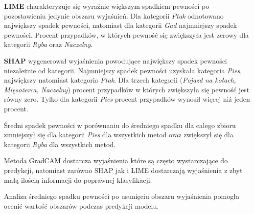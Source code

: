 \textbf{LIME} charakteryzuje się wyraźnie większym spadkiem pewności po pozostawieniu jedynie obszaru wyjaśnień.
Dla kategorii \textit{Ptak} odnotowano największy spadek pewności, natomiast dla kategorii \textit{Gad} najmniejszy spadek pewności.
Procent przypadków, w których pewność się zwiększyła jest zerowy dla kategorii \textit{Ryba} oraz \textit{Naczelny}.

\textbf{SHAP} wygenerował wyjaśnienia powodujące największy spadek pewności niezależnie od kategorii.
Najmniejszy spadek pewności uzyskała kategoria \textit{Pies}, największy natomiast kategoria \textit{Ptak}.
Dla trzech kategorii (\textit{Pojazd na kołach, Mięsożerca, Naczelny}) procent przypadków w których zwiększyła się pewność jest równy zero.
Tylko dla kategorii \textit{Pies} procent przypadków wynosił więcej niż jeden procent.

Średni spadek pewności w porównaniu do średniego spadku dla całego zbioru zmniejszył się dla kategorii \textit{Pies} dla wszystkich metod oraz zwiększył się dla kategorii \textit{Ryba} dla wszystkich metod.

Metoda GradCAM dostarcza wyjaśnienia które są często wystarczające do predykcji, natomiast zarówno SHAP jak i LIME dostarczają wyjaśnienia z zbyt małą ilością informacji do poprawnej klasyfikacji.

\vspace{1cm}

Analiza średniego spadku pewności po usunięciu obszaru wyjaśnienia pomogła ocenić wartość obszarów podczas predykcji modelu.

